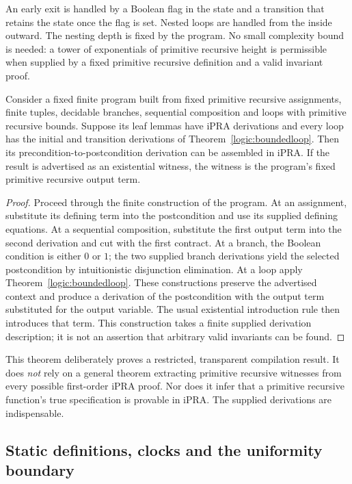 An early exit is handled by a Boolean flag in the state and a transition that
retains the state once the flag is set.  Nested loops are handled from the
inside outward.  The nesting depth is fixed by the program.  No small
complexity bound is needed: a tower of exponentials of primitive recursive
height is permissible when supplied by a fixed primitive recursive
definition and a valid invariant proof.

\begin{theorem}
\label{logic:compilation}
Consider a fixed finite program built from fixed primitive recursive
assignments, finite tuples, decidable branches, sequential composition and
loops with primitive recursive bounds.  Suppose its leaf lemmas have iPRA
derivations and every loop has the initial and transition derivations of
Theorem~\ref{logic:boundedloop}.  Then its precondition-to-postcondition
derivation can be assembled in iPRA.  If the result is advertised as an
existential witness, the witness is the program's fixed primitive recursive
output term.
\end{theorem}

\begin{proof}
Proceed through the finite construction of the program.  At an assignment,
substitute its defining term into the postcondition and use its supplied
defining equations.  At a sequential composition, substitute the first
output term into the second derivation and cut with the first contract.  At
a branch, the Boolean condition is either $0$ or $1$; the two supplied
branch derivations yield the selected postcondition by intuitionistic
disjunction elimination.  At a loop apply Theorem~\ref{logic:boundedloop}.
These constructions preserve the advertised context and produce a derivation
of the postcondition with the output term substituted for the output
variable.  The usual existential introduction rule then introduces that
term.  This construction takes a finite supplied derivation description;
it is not an assertion that arbitrary valid invariants can be found.
\end{proof}

This theorem deliberately proves a restricted, transparent compilation
result.  It does \emph{not} rely on a general theorem extracting primitive
recursive witnesses from every possible first-order iPRA proof.  Nor does it
infer that a primitive recursive function's true specification is provable
in iPRA.  The supplied derivations are indispensable.

\subsection{Static definitions, clocks and the uniformity boundary}

